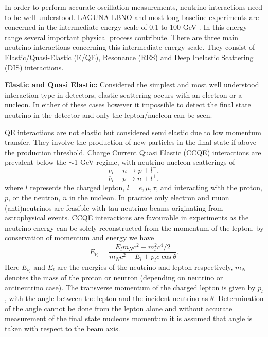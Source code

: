 In order to perform accurate oscillation measurements, neutrino interactions need to be well understood. LAGUNA-LBNO and most long baseline experiments are concerned in the intermediate energy scale of 0.1 to 100 GeV \cite{neutrinoCrossSections}. In this energy range several important physical process contribute. 
There are three main neutrino interactions concerning this intermediate energy scale. They consist of Elastic/Quasi-Elastic (E/QE), Resonance (RES) and Deep Inelastic Scattering (DIS) interactions. 

\textbf{Elastic and Quasi Elastic:} Considered the simplest and most well understood interaction type in detectors, elastic scattering occurs with an electron or a nucleon. In either of these cases however it impossible to detect the final state neutrino in the detector and only the lepton/nucleon can be seen. 

QE interactions are not elastic but considered semi elastic due to low momentum transfer. They involve the production of new particles in the final state if above the production threshold. Charge Current Quasi Elastic (CCQE) interactions are prevalent below the $\sim$1 GeV regime, with neutrino-nucleon scatterings of
\begingroup
  \addtolength{}%
  \addtolength{}%
 \addtolength{}%
 \addtolength{}%
\begin{equation}
\nu_{l} + n \rightarrow p + l^{-},
\end{equation}
\begin{equation}
\overline{\nu}_{l} + p \rightarrow n + l^{+},
\end{equation}
\endgroup
where $l$ represents the charged lepton, $l = e,\mu,\tau$, and interacting with the proton, $p$, or the neutron, $n$ in the nucleon. In practice only electron and muon (anti)neutrinos are feasible with tau neutrino beams originating from astrophysical events. CCQE interactions are favourable in experiments as the neutrino energy can be solely reconstructed from the momentum of the lepton, by conservation of momentum and energy we have
\begin{equation}
E_{\nu_{l}} = \frac{E_{l}m_{N}c^{2} - m^{2}_{l}c^{4}/2}{m_{N}c^{2} - E_{l} + p_{l}c\cos{\theta}}.
	\label{eq:ccqeNuEnergy}
\end{equation}
Here $E_{\nu_{l}}$ and $E_{l}$ are the energies of the neutrino and lepton respectively, $m_{N}$ denotes the mass of the proton or neutron (depending on neutrino or antineutrino case). The transverse momentum of the charged lepton is given by $p_{l}$, with the angle between the lepton and the incident neutrino as $\theta$. Determination of the angle cannot be done from the lepton alone and without accurate measurement of the final state nucleons momentum it is assumed that angle is taken with respect to the beam axis. 

